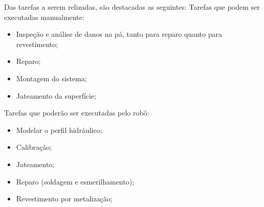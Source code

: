 Das tarefas a serem relizadas, são destacadas as seguintes:
Tarefas que podem ser executadas manualmente:
\begin{itemize}
  \item Inspeção e análise de danos na pá, tanto para reparo quanto para
  revestimento;
  \item Reparo;
  \item Montagem do sistema;
  \item Jateamento da superfície;
\end{itemize}

Tarefas que poderão ser executadas pelo robô:
\begin{itemize}
  \item Modelar o perfil hidráulico;
  \item Calibração;
  \item Jateamento;
  \item Reparo (soldagem e esmerilhamento);
  \item Revestimento por metalização;
\end{itemize}
